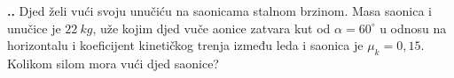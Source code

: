 

\noindent 
\textbf{
\thecjelina.\thezadatak.}
Djed želi vući svoju unučiću na saonicama stalnom brzinom. Masa saonica i unučice je $22\ kg$, uže kojim djed vuče aonice zatvara kut 
od $\alpha=60^\circ$ u odnosu na horizontalu i koeficijent kinetičkog trenja između leda i saonica je $\mu_k=0,15$. Kolikom silom mora vući djed saonice?

